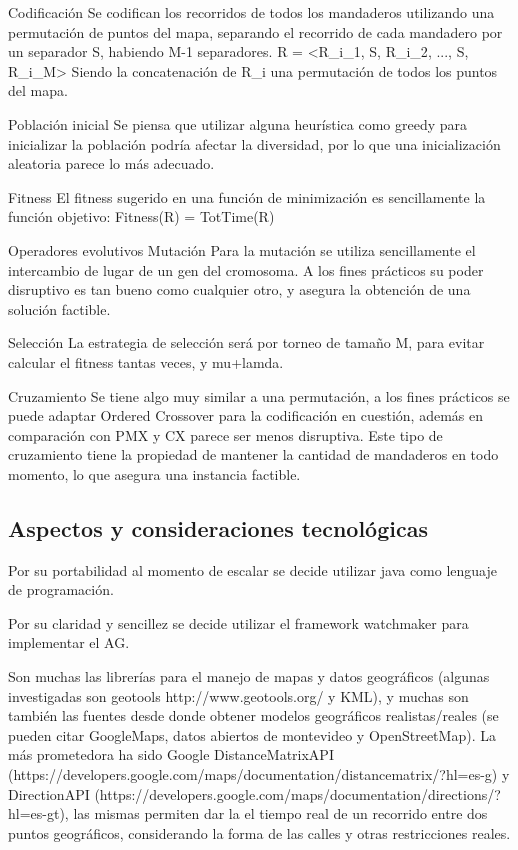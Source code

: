 \documentclass[9pt,conference]{IEEEtran}
\begin{document}
		Codificación
			Se codifican los recorridos de todos los mandaderos utilizando una permutación de puntos del mapa, separando el recorrido de cada mandadero por un separador S, habiendo M-1 separadores.
			R = <R_{i_1}, S, R_{i_2}, ..., S, R_{i_M}>
			Siendo la concatenación de R_i una permutación de todos los puntos del mapa.

		Población inicial
			Se piensa que utilizar alguna heurística como greedy para inicializar la población podría afectar la diversidad, por lo que una inicialización aleatoria parece lo más adecuado.

		Fitness
			El fitness sugerido en una función de minimización es sencillamente la función objetivo:
			Fitness(R) = TotTime(R)

		Operadores evolutivos
			Mutación
				Para la mutación se utiliza sencillamente el intercambio de lugar de un gen del cromosoma. A los fines prácticos su poder disruptivo es tan bueno como cualquier otro, y asegura la obtención de una solución factible. 

			Selección
				La estrategia de selección será por torneo de tamaño M, para evitar calcular el fitness tantas veces, y mu+lamda.

			Cruzamiento
				Se tiene algo muy similar a una permutación, a los fines prácticos se puede adaptar Ordered Crossover para la codificación en cuestión, además en comparación con PMX y CX parece ser menos disruptiva. Este tipo de cruzamiento tiene la propiedad de mantener la cantidad de mandaderos en todo momento, lo que asegura una instancia factible.


	\subsection{Aspectos y consideraciones tecnológicas}

		
		Por su portabilidad al momento de escalar se decide utilizar java como lenguaje de programación.
		
		Por su claridad y sencillez se decide utilizar el framework watchmaker para implementar el AG.
		
		Son muchas las librerías para el manejo de mapas y datos geográficos (algunas investigadas son geotools http://www.geotools.org/ y KML), y muchas son también las fuentes desde donde obtener modelos geográficos realistas/reales (se pueden citar GoogleMaps, datos abiertos de montevideo y OpenStreetMap). La más prometedora ha sido Google DistanceMatrixAPI (https://developers.google.com/maps/documentation/distancematrix/?hl=es-g) y DirectionAPI (https://developers.google.com/maps/documentation/directions/?hl=es-gt), las mismas permiten dar la el tiempo real de un recorrido entre dos puntos geográficos, considerando la forma de las calles y otras restricciones reales.
\end{document}
